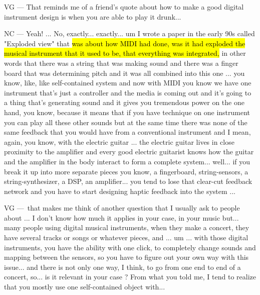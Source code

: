 VG — That reminds me of a friend's quote about how to make a good digital instrument design is when you are able to play it drunk... 

NC — Yeah! ... No, exactly... exactly... um I wrote a paper in the early 90s called "Exploded view" that \hl{was about how MIDI had done, was it had exploded the musical instrument that it used to be, that everything was integrated,} in other words that there was a string that was making sound and there was a finger board that was determining pitch and it was all combined into this one ... you know, like, like self-contained system and now with MIDI you know we have one instrument that's just a controller and the media is coming out and it's going to a thing that's generating sound and it gives you tremendous power on the one hand, you know,  because it means that if you have technique on one instrument you can play all these other sounds but at the same time there was none of the same feedback that you would have from a conventional instrument and I mean, again, you know, with the electric guitar ... the electric guitar lives in close proximity to the amplifier and every good electric guitarist knows how the guitar and the amplifier in the body interact to form a complete system... well... if you break it up into more separate pieces you know, a fingerboard, string-sensors, a string-synthesizer, a DSP, an amplifier... you tend to lose that clear-cut feedback network and you have to start designing haptic feedback into the system ...

VG — that makes me think of another question that I usually ask to people about ... I don't know how much it applies in your case, in your music but... many people using digital musical instruments, when they make a concert, they have several tracks or songs or whatever pieces, and ... um ... with those digital instruments, you have the ability with one click, to completely change sounds and mapping between the sensors, so you have to figure out your own way with this issue... and there is not only one way, I think, to go from one end to end of a concert, so... is it relevant in your case ? From what you told me, I tend to realize that you mostly use one self-contained object with... 

